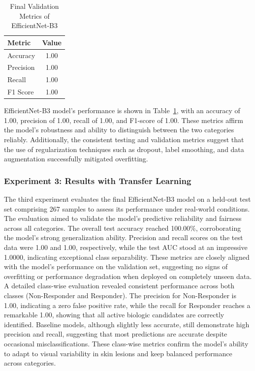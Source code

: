 \documentclass[11pt,journal,compsoc]{IEEEtran}
\begin{document}
\begin{table}[h]
\centering
\caption{Final Validation Metrics of EfficientNet-B3}
\label{tab:val_metrics}
\begin{tabular}{lc}
\toprule
Metric & Value \\
\midrule
Accuracy & 1.00 \\
Precision & 1.00 \\
Recall & 1.00 \\
F1 Score & 1.00 \\
\bottomrule
\end{tabular}
\end{table}

EfficientNet-B3 model’s performance is shown in Table~\ref{tab:val_metrics}, with an accuracy of 1.00, precision of 1.00, recall of 1.00, and F1-score of 1.00. These metrics affirm the model’s robustness and ability to distinguish between the two categories reliably. Additionally, the consistent testing and validation metrics suggest that the use of regularization techniques such as dropout, label smoothing, and data augmentation successfully mitigated overfitting.

\subsubsection{Experiment 3: Results with Transfer Learning}
The third experiment evaluates the final EfficientNet-B3 model on a held-out test set comprising 267 samples to assess its performance under real-world conditions. The evaluation aimed to validate the model’s predictive reliability and fairness across all categories. The overall test accuracy reached 100.00\%, corroborating the model's strong generalization ability. Precision and recall scores on the test data were 1.00 and 1.00, respectively, while the test AUC stood at an impressive 1.0000, indicating exceptional class separability. These metrics are closely aligned with the model's performance on the validation set, suggesting no signs of overfitting or performance degradation when deployed on completely unseen data. A detailed class-wise evaluation revealed consistent performance across both classes (Non-Responder and Responder). The precision for Non-Responder is 1.00, indicating a zero false positive rate, while the recall for Responder reaches a remarkable 1.00, showing that all active biologic candidates are correctly identified. Baseline models, although slightly less accurate, still demonstrate high precision and recall, suggesting that most predictions are accurate despite occasional misclassifications. These class-wise metrics confirm the model’s ability to adapt to visual variability in skin lesions and keep balanced performance across categories.
\end{document}
